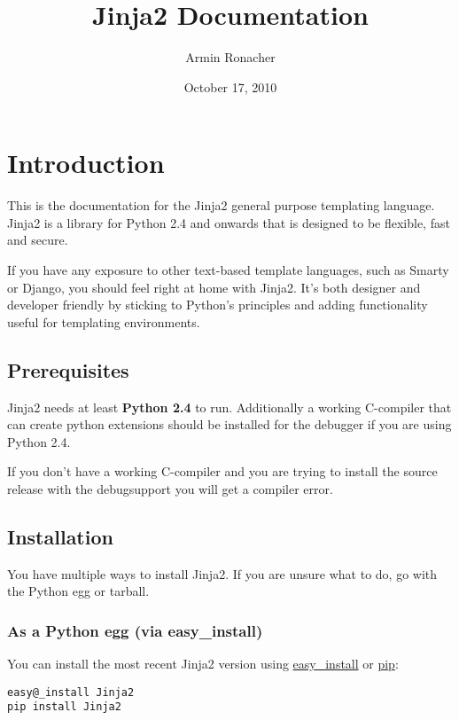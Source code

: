 \documentclass[a4paper,10pt,english]{sphinxmanual}
\title{Jinja2 Documentation}
\date{October 17, 2010}
\author{Armin Ronacher}
\begin{document}
\maketitle
\tableofcontents
{}\label{index::doc}



\chapter{Introduction}
\label{intro:introduction}\label{intro::doc}
This is the documentation for the Jinja2 general purpose templating language.
Jinja2 is a library for Python 2.4 and onwards that is designed to be flexible,
fast and secure.

If you have any exposure to other text-based template languages, such as Smarty or
Django, you should feel right at home with Jinja2.  It's both designer and
developer friendly by sticking to Python's principles and adding functionality
useful for templating environments.


\section{Prerequisites}
\label{intro:prerequisites}
Jinja2 needs at least \textbf{Python 2.4} to run.  Additionally a working C-compiler
that can create python extensions should be installed for the debugger if you
are using Python 2.4.

If you don't have a working C-compiler and you are trying to install the source
release with the debugsupport you will get a compiler error.


\section{Installation}
\label{intro:installation}\label{intro:ctypes}
You have multiple ways to install Jinja2.  If you are unsure what to do, go
with the Python egg or tarball.


\subsection{As a Python egg (via easy\_install)}
\label{intro:as-a-python-egg-via-easy-install}
You can install the most recent Jinja2 version using \href{http://peak.telecommunity.com/DevCenter/EasyInstall}{easy\_install} or \href{http://pypi.python.org/pypi/pip}{pip}:

\begin{Verbatim}[commandchars=@\[\]]
easy@_install Jinja2
pip install Jinja2
\end{Verbatim}
\end{document}
